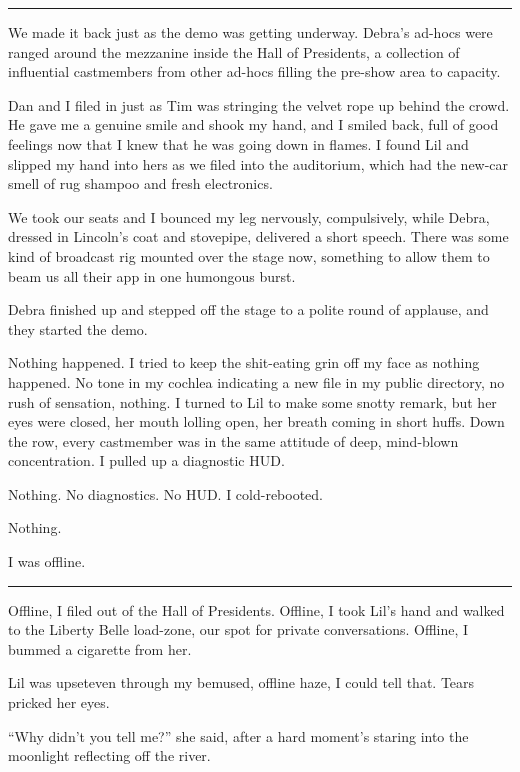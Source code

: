 \begin{center}\rule{3in}{0.4pt}\end{center}

We made it back just as the demo was getting underway. Debra's
ad-hocs were ranged around the mezzanine inside the Hall of
Presidents, a collection of influential castmembers from other
ad-hocs filling the pre-show area to capacity.

Dan and I filed in just as Tim was stringing the velvet rope up
behind the crowd. He gave me a genuine smile and shook my hand, and
I smiled back, full of good feelings now that I knew that he was
going down in flames. I found Lil and slipped my hand into hers as
we filed into the auditorium, which had the new-car smell of rug
shampoo and fresh electronics.

We took our seats and I bounced my leg nervously, compulsively,
while Debra, dressed in Lincoln's coat and stovepipe, delivered a
short speech. There was some kind of broadcast rig mounted over the
stage now, something to allow them to beam us all their app in one
humongous burst.

Debra finished up and stepped off the stage to a polite round of
applause, and they started the demo.

Nothing happened. I tried to keep the shit-eating grin off my face
as nothing happened. No tone in my cochlea indicating a new file in
my public directory, no rush of sensation, nothing. I turned to Lil
to make some snotty remark, but her eyes were closed, her mouth
lolling open, her breath coming in short huffs. Down the row, every
castmember was in the same attitude of deep, mind-blown
concentration. I pulled up a diagnostic HUD.

Nothing. No diagnostics. No HUD. I cold-rebooted.

Nothing.

I was offline.

\begin{center}\rule{3in}{0.4pt}\end{center}

Offline, I filed out of the Hall of Presidents. Offline, I took
Lil's hand and walked to the Liberty Belle load-zone, our spot for
private conversations. Offline, I bummed a cigarette from her.

Lil was upset{\dash}even through my bemused, offline haze, I could tell
that. Tears pricked her eyes.

“Why didn't you tell me?” she said, after a hard moment's staring
into the moonlight reflecting off the river.

